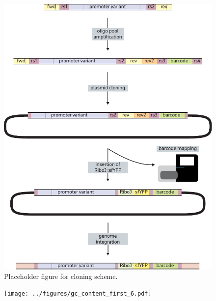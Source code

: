 \begin{figure}[H]
    \centering
    \includegraphics{../figures/cloning_scheme.pdf}
    \caption{Placeholder figure for cloning scheme.}
    \label{fig:cloning}
\end{figure}

\begin{figure}
    \centering
    \texttt{[image: ../figures/gc\_content\_first\_6.pdf]}
    \caption{}
    \label{fig:prom_gc_content}
\end{figure}
  